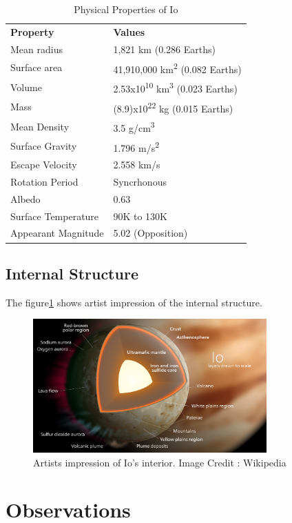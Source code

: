 \documentclass[a4paper,11pt,oneside]{article}
\begin{document}
\begin{table}[ht]
\centering
\begin{tabular}{ll}
\textbf{Property} & \textbf{Values}  \\
Mean radius & 1,821 km (0.286 Earths) \\
Surface area & 41,910,000 km\textsuperscript{2} (0.082 Earths) \\
Volume & 2.53x10\textsuperscript{10} km\textsuperscript{3} (0.023 Earths) \\
Mass & (8.9)x10\textsuperscript{22} kg (0.015 Earths) \\
Mean Density & 3.5 g/cm\textsuperscript{3} \\
Surface Gravity & 1.796 m/s\textsuperscript{2} \\
Escape Velocity & 2.558 km/s \\
Rotation Period & Syncrhonous\\
Albedo & 0.63\\
Surface Temperature & 90K to 130K \\
Appearant Magnitude & 5.02 (Opposition)
\end{tabular}
\caption{Physical Properties of Io}
\label{table:2}
\end{table}

\subsection{Internal Structure}
The figure\ref{fig:iointernal} shows artist impression of the internal structure.
\begin{figure}[ht]
\centering
\includegraphics[width=0.8\textwidth]{figures/io-internal.png}
\caption{Artists impression of Io's interior. Image Credit : Wikipedia}
\label{fig:iointernal}
\end{figure}
\newline
\section{Observations}
\end{document}
